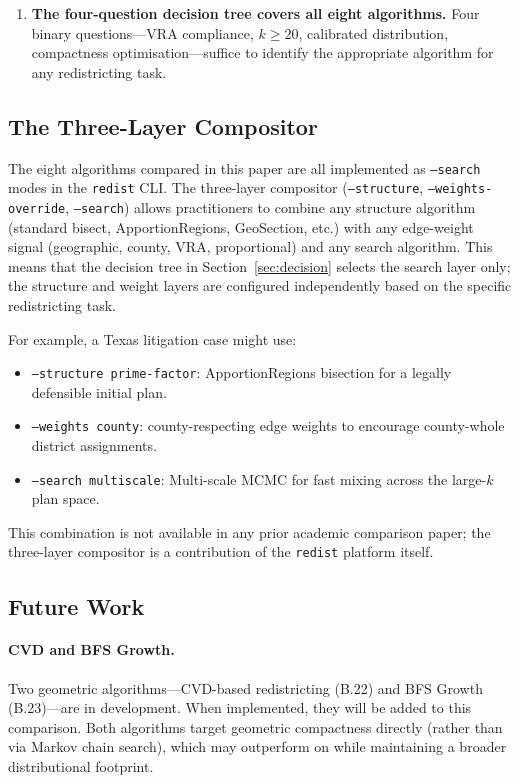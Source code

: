\begin{enumerate}
  \item \textbf{The four-question decision tree covers all eight algorithms.}
        Four binary questions---VRA compliance, $k \geq 20$, calibrated
        distribution, compactness optimisation---suffice to identify the
        appropriate algorithm for any redistricting task.

\end{enumerate}

\subsection{The Three-Layer Compositor}

The eight algorithms compared in this paper are all implemented as
\texttt{--search} modes in the \texttt{redist} CLI.
The three-layer compositor (\texttt{--structure},
\texttt{--weights-override}, \texttt{--search}) allows practitioners to
combine any structure algorithm (standard bisect, ApportionRegions,
GeoSection, etc.) with any edge-weight signal (geographic, county, VRA,
proportional) and any search algorithm.
This means that the decision tree in Section~\ref{sec:decision} selects
the search layer only; the structure and weight layers are configured
independently based on the specific redistricting task.

For example, a Texas litigation case might use:
\begin{itemize}
  \item \texttt{--structure prime-factor}: ApportionRegions bisection for
        a legally defensible initial plan.
  \item \texttt{--weights county}: county-respecting edge weights to
        encourage county-whole district assignments.
  \item \texttt{--search multiscale}: Multi-scale MCMC for fast mixing
        across the large-$k$ plan space.
\end{itemize}

This combination is not available in any prior academic comparison paper;
the three-layer compositor is a contribution of the \texttt{redist}
platform itself.

\subsection{Future Work}

\paragraph{CVD and BFS Growth.}
Two geometric algorithms---CVD-based redistricting (B.22) and BFS Growth
(B.23)---are in development.
When implemented, they will be added to this comparison.
Both algorithms target geometric compactness directly (rather than
via Markov chain search), which may outperform \sburst{} on \pp{} while
maintaining a broader distributional footprint.

